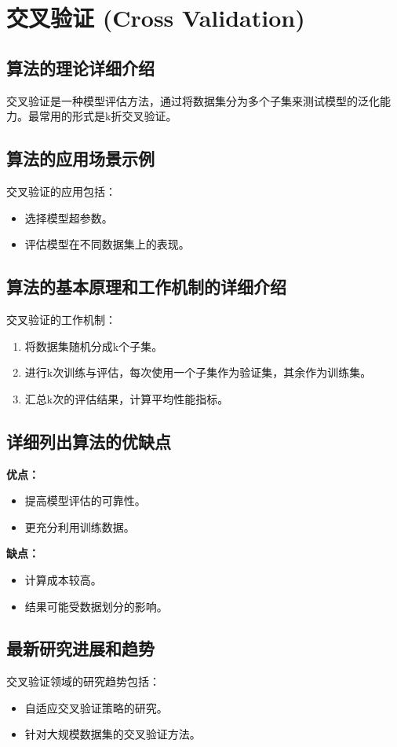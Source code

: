 \section{交叉验证 (Cross Validation)}
\subsection*{算法的理论详细介绍}
交叉验证是一种模型评估方法，通过将数据集分为多个子集来测试模型的泛化能力。最常用的形式是k折交叉验证。

\subsection*{算法的应用场景示例}
交叉验证的应用包括：
\begin{itemize}
    \item 选择模型超参数。
    \item 评估模型在不同数据集上的表现。
\end{itemize}

\subsection*{算法的基本原理和工作机制的详细介绍}
交叉验证的工作机制：
\begin{enumerate}
    \item 将数据集随机分成k个子集。
    \item 进行k次训练与评估，每次使用一个子集作为验证集，其余作为训练集。
    \item 汇总k次的评估结果，计算平均性能指标。
\end{enumerate}

\subsection*{详细列出算法的优缺点}
\textbf{优点：}
\begin{itemize}
    \item 提高模型评估的可靠性。
    \item 更充分利用训练数据。
\end{itemize}

\textbf{缺点：}
\begin{itemize}
    \item 计算成本较高。
    \item 结果可能受数据划分的影响。
\end{itemize}

\subsection*{最新研究进展和趋势}
交叉验证领域的研究趋势包括：
\begin{itemize}
    \item 自适应交叉验证策略的研究。
    \item 针对大规模数据集的交叉验证方法。
\end{itemize}
